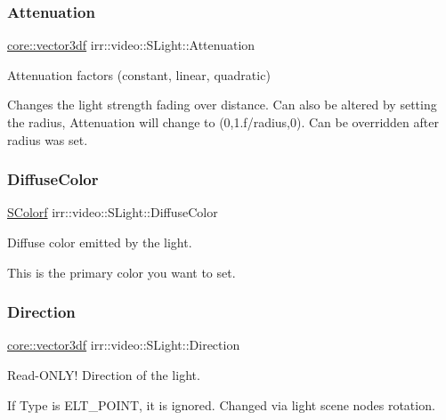 \subsubsection{\texorpdfstring{Attenuation}{Attenuation}}
{\footnotesize\ttfamily \hyperlink{namespaceirr_1_1core_a06f169d08b5c429f5575acb7edbad811}{core\+::vector3df} irr\+::video\+::\+S\+Light\+::\+Attenuation}



Attenuation factors (constant, linear, quadratic) 

Changes the light strength fading over distance. Can also be altered by setting the radius, Attenuation will change to (0,1.\+f/radius,0). Can be overridden after radius was set. \mbox{\label{structirr_1_1video_1_1SLight_a226622e93aa1e249fe876fdb9d0186fe}} 
\subsubsection{\texorpdfstring{Diffuse\+Color}{DiffuseColor}}
{\footnotesize\ttfamily \hyperlink{classirr_1_1video_1_1SColorf}{S\+Colorf} irr\+::video\+::\+S\+Light\+::\+Diffuse\+Color}



Diffuse color emitted by the light. 

This is the primary color you want to set. \mbox{\label{structirr_1_1video_1_1SLight_a226c488abec5696b995df6895ab42d41}} 
\subsubsection{\texorpdfstring{Direction}{Direction}}
{\footnotesize\ttfamily \hyperlink{namespaceirr_1_1core_a06f169d08b5c429f5575acb7edbad811}{core\+::vector3df} irr\+::video\+::\+S\+Light\+::\+Direction}



Read-\/\+O\+N\+L\+Y! Direction of the light. 

If Type is E\+L\+T\+\_\+\+P\+O\+I\+NT, it is ignored. Changed via light scene node\textquotesingle{}s rotation. \mbox{\label{structirr_1_1video_1_1SLight_ac1f0fda0cc1780b09a2597adcfc9c946}} 
